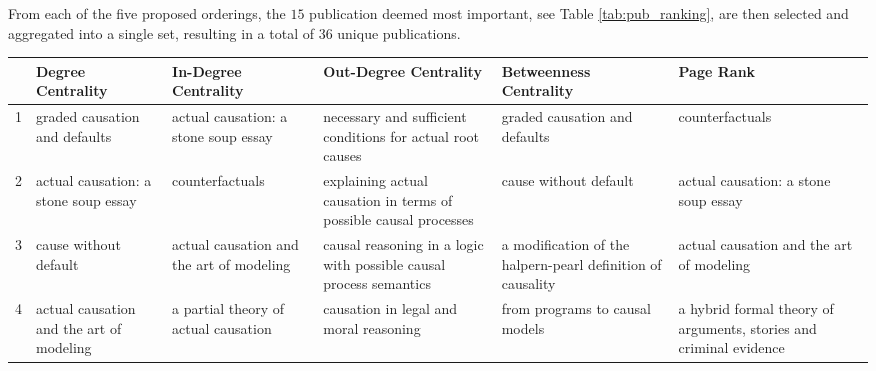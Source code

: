 \documentclass[11pt,a4paper]{book}
\theoremstyle{definition}
\theoremstyle{definition}
\theoremstyle{definition}
\theoremstyle{remark}
\newcommand{\prset}{S_{A}}
\begin{document}
From each of the five proposed orderings, the $15$ publication deemed most important, see Table \ref{tab:pub_ranking}, are then selected and aggregated into a single set, resulting in a total of $36$ unique publications.

\begin{table}
\centering
\scriptsize
\begin{tabular}{l p{3.7cm} p{3.7cm}p{3.7cm} p{3.7cm}p{3.7cm} }
\toprule
{} &                                                             Degree Centrality &                                                                                   In-Degree Centrality &                                                                 Out-Degree Centrality &                                                                                   Betweenness Centrality &                                                                                    Page Rank \\
\midrule
1  &                                      graded causation and defaults &                                                        actual causation: a stone soup essay &                 necessary and sufficient conditions for actual root causes &                                                             graded causation and defaults &                                                                             counterfactuals \\
2  &                               actual causation: a stone soup essay &                                                                             counterfactuals &          explaining actual causation in terms of possible causal processes &                                                                     cause without default &                                                        actual causation: a stone soup essay \\
3  &                                              cause without default &                                                    actual causation and the art of modeling &         causal reasoning in a logic with possible causal process semantics &                               a modification of the halpern-pearl definition of causality &                                                    actual causation and the art of modeling \\
4  &                           actual causation and the art of modeling &                                                        a partial theory of actual causation &                                     causation in legal and moral reasoning &                                                            from programs to causal models &                          a hybrid formal theory of arguments, stories and criminal evidence \\

\end{tabular}
\end{table}
\end{document}
